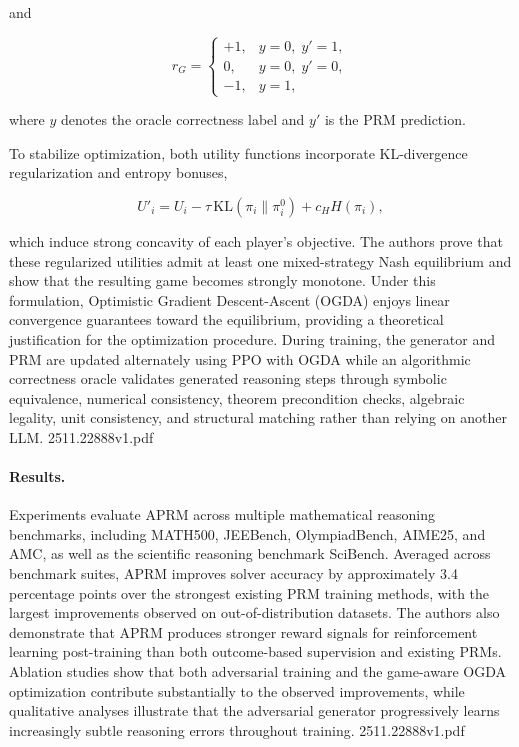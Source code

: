 \documentclass[11pt]{article}
\begin{document}
and

\[
r_G=
\begin{cases}
+1,& y=0,\;y'=1,\\
0,& y=0,\;y'=0,\\
-1,& y=1,
\end{cases}
\]

where \(y\) denotes the oracle correctness label and \(y'\) is the PRM prediction.

To stabilize optimization, both utility functions incorporate KL-divergence regularization and entropy bonuses,

\[
U'_i
=
U_i
-
\tau\,\mathrm{KL}(\pi_i\|\pi_i^{0})
+
c_H H(\pi_i),
\]

which induce strong concavity of each player's objective. The authors prove that these regularized utilities admit at least one mixed-strategy Nash equilibrium and show that the resulting game becomes strongly monotone. Under this formulation, Optimistic Gradient Descent-Ascent (OGDA) enjoys linear convergence guarantees toward the equilibrium, providing a theoretical justification for the optimization procedure. During training, the generator and PRM are updated alternately using PPO with OGDA while an algorithmic correctness oracle validates generated reasoning steps through symbolic equivalence, numerical consistency, theorem precondition checks, algebraic legality, unit consistency, and structural matching rather than relying on another LLM. 2511.22888v1.pdf

\paragraph{Results.}
Experiments evaluate APRM across multiple mathematical reasoning benchmarks, including MATH500, JEEBench, OlympiadBench, AIME25, and AMC, as well as the scientific reasoning benchmark SciBench. Averaged across benchmark suites, APRM improves solver accuracy by approximately 3.4 percentage points over the strongest existing PRM training methods, with the largest improvements observed on out-of-distribution datasets. The authors also demonstrate that APRM produces stronger reward signals for reinforcement learning post-training than both outcome-based supervision and existing PRMs. Ablation studies show that both adversarial training and the game-aware OGDA optimization contribute substantially to the observed improvements, while qualitative analyses illustrate that the adversarial generator progressively learns increasingly subtle reasoning errors throughout training. 2511.22888v1.pdf
\end{document}
